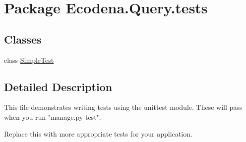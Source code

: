\hypertarget{namespace_ecodena_1_1_query_1_1tests}{
\section{Package Ecodena.Query.tests}
\label{d2/d88/namespace_ecodena_1_1_query_1_1tests}
}
\subsection*{Classes}
\begin{DoxyCompactItemize}
\item 
class \hyperlink{class_ecodena_1_1_query_1_1tests_1_1_simple_test}{SimpleTest}
\end{DoxyCompactItemize}


\subsection{Detailed Description}
\begin{DoxyVerb}
This file demonstrates writing tests using the unittest module. These will pass
when you run "manage.py test".

Replace this with more appropriate tests for your application.
\end{DoxyVerb}
 